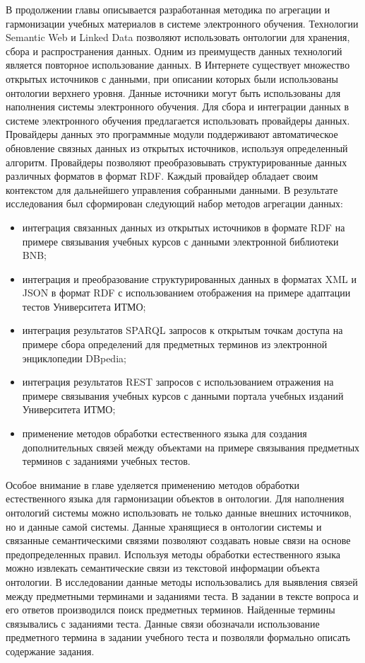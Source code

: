 
В продолжении главы описывается разработанная методика по агрегации и гармонизации учебных материалов в системе электронного обучения. Технологии Semantic Web и Linked Data позволяют использовать онтологии для хранения, сбора и распространения данных. Одним из преимуществ данных технологий является повторное использование данных. В Интернете существует множество открытых источников с данными, при описании которых были использованы онтологии верхнего уровня. Данные источники могут быть использованы для наполнения системы электронного обучения. Для сбора и интеграции данных в системе электронного обучения предлагается использовать провайдеры данных. Провайдеры данных это программные модули  поддерживают автоматическое обновление связных данных из открытых источников, используя определенный алгоритм. Провайдеры позволяют преобразовывать структурированные данных различных форматов в формат RDF. Каждый провайдер обладает своим контекстом для дальнейшего управления собранными данными. В результате исследования был сформирован следующий набор методов агрегации данных:

\begin{itemize}
\item интеграция связанных данных из открытых источников в формате RDF на примере связывания учебных курсов с данными электронной библиотеки BNB;
\item интеграция и преобразование структурированных данных в форматах XML и JSON в формат RDF с использованием отображения на примере адаптации тестов Университета ИТМО;
\item интеграция результатов SPARQL запросов к открытым точкам доступа на примере сбора определений для предметных терминов из электронной энциклопедии DBpedia;
\item интеграция результатов REST запросов с использованием отражения на примере связывания учебных курсов с данными портала учебных изданий Университета ИТМО;
\item применение методов обработки естественного языка для создания дополнительных связей между объектами на примере связывания предметных терминов с заданиями учебных тестов.
\end{itemize}

Особое внимание в главе уделяется применению методов обработки естественного языка для гармонизации объектов в онтологии. Для наполнения онтологий системы можно использовать не только данные внешних источников, но и данные самой системы. Данные хранящиеся в онтологии системы и связанные семантическими связями позволяют создавать новые связи на основе предопределенных правил. Используя методы обработки естественного языка можно извлекать семантические связи из текстовой информации объекта онтологии. В исследовании данные методы использовались для выявления связей между предметными терминами и заданиями теста. В задании в тексте вопроса и его ответов производился поиск предметных терминов. Найденные термины связывались с заданиями теста. Данные связи обозначали использование предметного термина в задании учебного теста и позволяли формально описать содержание задания. 

